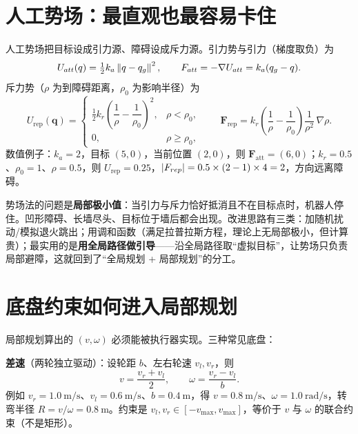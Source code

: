 \section{人工势场：最直观也最容易卡住}\label{sec:20-apf}

人工势场把目标设成引力源、障碍设成斥力源。引力势与引力（梯度取负）为
\begin{equation}
  U_{att}(q)=\tfrac12 k_a\left\lVert q-q_g \right\rVert^2,
  \qquad
  F_{att}=-\nabla U_{att}=k_a(q_g-q).
  \label{eq:20-att}
\end{equation}
斥力势（$\rho$ 为到障碍距离，$\rho_0$ 为影响半径）为
\begin{equation}
  U_{\mathrm{rep}}(\bm{q})=
  \begin{cases}
    \tfrac12 k_r\left(\dfrac{1}{\rho}-\dfrac{1}{\rho_0}\right)^2, & \rho<\rho_0,\\[6pt]
    0, & \rho\ge\rho_0,
  \end{cases}
  \qquad
  \bm{F}_{\mathrm{rep}}=k_r\left(\frac{1}{\rho}-\frac{1}{\rho_0}\right)\frac{1}{\rho^2}\,\nabla\rho.
  \label{eq:20-rep}
\end{equation}
数值例子：$k_a=2$，目标 $(5,0)$，当前位置 $(2,0)$，则 $\bm{F}_{\mathrm{att}}=(6,0)$；$k_r=0.5$、$\rho_0=1$、$\rho=0.5$，则 $U_{\mathrm{rep}}=0.25$，$\left\lvert F_{rep} \right\rvert=0.5\times(2-1)\times4=2$，方向远离障碍。

势场法的问题是\textbf{局部极小值}：当引力与斥力恰好抵消且不在目标点时，机器人停住。凹形障碍、长墙尽头、目标位于墙后都会出现。改进思路有三类：加随机扰动/模拟退火跳出；用调和函数（满足拉普拉斯方程，理论上无局部极小，但计算贵）；最实用的是\textbf{用全局路径做引导}——沿全局路径取“虚拟目标”，让势场只负责局部避障，这就回到了“全局规划 + 局部规划”的分工。

\section{底盘约束如何进入局部规划}\label{sec:20-kinematics}

局部规划算出的 $(v,\omega)$ 必须能被执行器实现。三种常见底盘：

\textbf{差速}（两轮独立驱动）：设轮距 $b$、左右轮速 $v_l,v_r$，则
\begin{equation}
  v=\frac{v_r+v_l}{2},\qquad \omega=\frac{v_r-v_l}{b}.
  \label{eq:20-diff}
\end{equation}
例如 $v_r=1.0\ \mathrm{m/s}$、$v_l=0.6\ \mathrm{m/s}$、$b=0.4\ \mathrm{m}$，得 $v=0.8\ \mathrm{m/s}$、$\omega=1.0\ \mathrm{rad/s}$，转弯半径 $R=v/\omega=0.8\ \mathrm{m}$。约束是 $v_l,v_r\in[-v_{\max},v_{\max}]$，等价于 $v$ 与 $\omega$ 的联合约束（不是矩形）。

